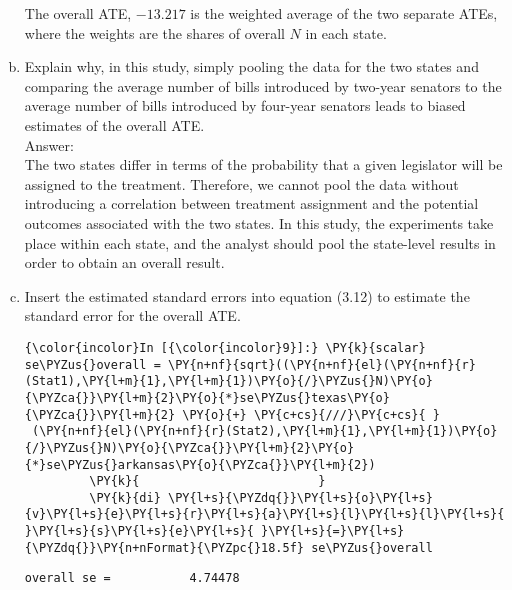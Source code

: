 \documentclass[11pt,notitlepage]{article}\usepackage[]{graphicx}\usepackage[]{color}
\makeatletter
\newenvironment{kframe}{%
 \def\at@end@of@kframe{}%
 \ifinner\ifhmode%
  \def\at@end@of@kframe{\end{minipage}}%
  \begin{minipage}{\columnwidth}%
 \fi\fi%
 \def\FrameCommand##1{\hskip\@totalleftmargin \hskip-\fboxsep
 \colorbox{shadecolor}{##1}\hskip-\fboxsep
     \hskip-\linewidth \hskip-\@totalleftmargin \hskip\columnwidth}%
 \MakeFramed {\advance\hsize-\width
   \@totalleftmargin\z@ \linewidth\hsize
   \@setminipage}}%
 {\par\unskip\endMakeFramed%
 \at@end@of@kframe}
\newenvironment{knitrout}{}{} %
\makeatother
\begin{document}
\begin{enumerate}[a)]
The overall ATE, \ensuremath{-13.217} is the weighted average of the two separate ATEs, where the weights are the shares of overall $N$ in each state.

\item Explain why, in this study, simply pooling the data for the two states and comparing the average number of bills introduced by two-year senators to the average number of bills introduced by four-year senators leads to biased estimates of the overall ATE. \\
Answer:\\
The two states differ in terms of the probability that a given legislator will be assigned to the treatment. Therefore, we cannot pool the data without introducing a correlation between treatment assignment and the potential outcomes associated with the two states. In this study, the experiments take place within each state, and the analyst should pool the state-level results in order to obtain an overall result.

\item Insert the estimated standard errors into equation (3.12) to estimate the standard error for the overall ATE.

\begin{knitrout}
\color{fgcolor}\begin{kframe}
   \begin{Verbatim}[commandchars=\\\{\}]
{\color{incolor}In [{\color{incolor}9}]:} \PY{k}{scalar} se\PYZus{}overall = \PY{n+nf}{sqrt}((\PY{n+nf}{el}(\PY{n+nf}{r}(Stat1),\PY{l+m}{1},\PY{l+m}{1})\PY{o}{/}\PYZus{}N)\PY{o}{\PYZca{}}\PY{l+m}{2}\PY{o}{*}se\PYZus{}texas\PY{o}{\PYZca{}}\PY{l+m}{2} \PY{o}{+} \PY{c+cs}{///}\PY{c+cs}{ }
 (\PY{n+nf}{el}(\PY{n+nf}{r}(Stat2),\PY{l+m}{1},\PY{l+m}{1})\PY{o}{/}\PYZus{}N)\PY{o}{\PYZca{}}\PY{l+m}{2}\PY{o}{*}se\PYZus{}arkansas\PY{o}{\PYZca{}}\PY{l+m}{2})
         \PY{k}{						 }
         \PY{k}{di} \PY{l+s}{\PYZdq{}}\PY{l+s}{o}\PY{l+s}{v}\PY{l+s}{e}\PY{l+s}{r}\PY{l+s}{a}\PY{l+s}{l}\PY{l+s}{l}\PY{l+s}{ }\PY{l+s}{s}\PY{l+s}{e}\PY{l+s}{ }\PY{l+s}{=}\PY{l+s}{\PYZdq{}}\PY{n+nFormat}{\PYZpc{}18.5f} se\PYZus{}overall
\end{Verbatim}

    \begin{Verbatim}[commandchars=\\\{\}]
overall se =           4.74478
    \end{Verbatim}
\end{kframe}
\end{knitrout}


\end{enumerate}
\end{document}
